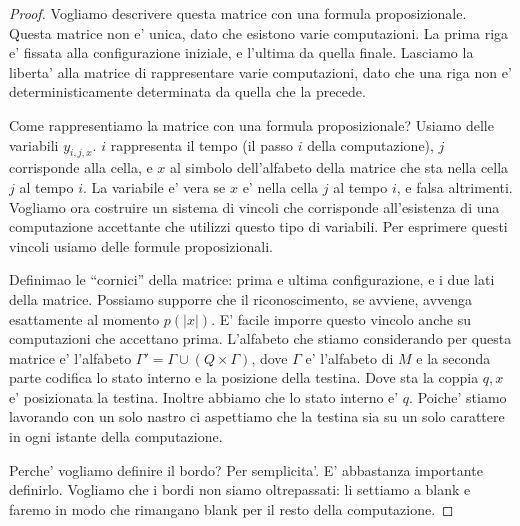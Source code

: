 \begin{proof}
    Vogliamo descrivere questa matrice con una formula proposizionale. Questa matrice non e' unica,
    dato che esistono varie computazioni. La prima riga e' fissata alla configurazione iniziale, e
    l'ultima da quella finale. Lasciamo la liberta' alla matrice di rappresentare varie
    computazioni, dato che una riga non e' deterministicamente determinata da quella che la precede.


    Come rappresentiamo la matrice con una formula proposizionale?
    Usiamo delle variabili $y_{i,j,x}$. $i$ rappresenta il tempo (il passo $i$ della computazione),
    $j$ corrisponde alla cella, e $x$ al simbolo dell'alfabeto della matrice che sta nella cella $j$
    al tempo $i$.  La variabile e' vera se $x$ e' nella cella $j$ al tempo $i$, e falsa altrimenti.
    Vogliamo ora costruire un sistema di vincoli che corrisponde all'esistenza di una computazione
    accettante che utilizzi questo tipo di variabili. Per esprimere questi vincoli usiamo delle
    formule proposizionali.

    Definimao le ``cornici'' della matrice: prima e ultima configurazione, e i due lati della
    matrice. Possiamo supporre che il riconoscimento, se avviene, avvenga esattamente al momento
    $p(|x|)$. E' facile imporre questo vincolo anche su computazioni che accettano prima. L'alfabeto
    che stiamo considerando per questa matrice e' l'alfabeto $\Gamma' = \Gamma \cup (Q \times
    \Gamma)$, dove $\Gamma$ e' l'alfabeto di $M$ e la seconda parte codifica lo stato interno e la
    posizione della testina. Dove sta la coppia $q,x$ e' posizionata la testina. Inoltre abbiamo che
    lo stato interno e' $q$. Poiche' stiamo lavorando con un solo nastro ci aspettiamo che la
    testina sia su un solo carattere in ogni istante della computazione.

    Perche' vogliamo definire il bordo? Per semplicita'. E' abbastanza importante definirlo.
    Vogliamo che i bordi non siamo oltrepassati: li settiamo a blank e
    faremo in modo che rimangano blank per il resto della computazione.


\end{proof}
